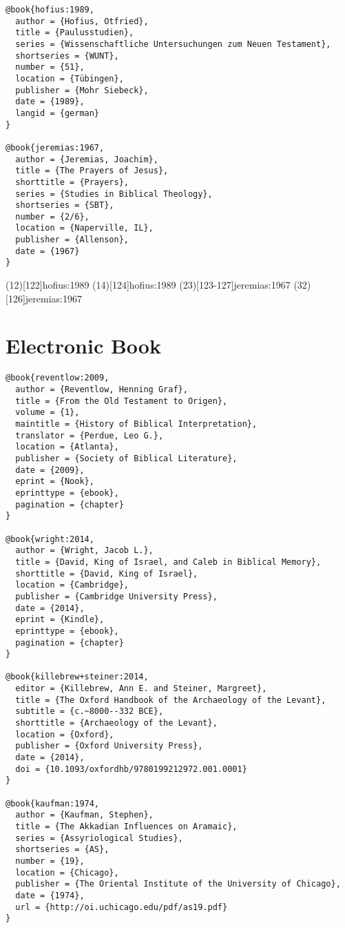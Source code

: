 \documentclass[a4paper]{article}
\begin{document}
\begin{verbatim}
@book{hofius:1989,
  author = {Hofius, Otfried},
  title = {Paulusstudien},
  series = {Wissenschaftliche Untersuchungen zum Neuen Testament},
  shortseries = {WUNT},
  number = {51},
  location = {Tübingen},
  publisher = {Mohr Siebeck},
  date = {1989},
  langid = {german}
}

@book{jeremias:1967,
  author = {Jeremias, Joachim},
  title = {The Prayers of Jesus},
  shorttitle = {Prayers},
  series = {Studies in Biblical Theology},
  shortseries = {SBT},
  number = {2/6},
  location = {Naperville, IL},
  publisher = {Allenson},
  date = {1967}
}
\end{verbatim}

\examplecite(12)[122]{hofius:1989}
\examplecite(14)[124]{hofius:1989}
\examplecite(23)[123-127]{jeremias:1967}
\examplecite(32)[126]{jeremias:1967}
\exampleabbreviations
\examplebibliography

\section{Electronic Book}

\begin{verbatim}
@book{reventlow:2009,
  author = {Reventlow, Henning Graf},
  title = {From the Old Testament to Origen},
  volume = {1},
  maintitle = {History of Biblical Interpretation},
  translator = {Perdue, Leo G.},
  location = {Atlanta},
  publisher = {Society of Biblical Literature},
  date = {2009},
  eprint = {Nook},
  eprinttype = {ebook},
  pagination = {chapter}
}

@book{wright:2014,
  author = {Wright, Jacob L.},
  title = {David, King of Israel, and Caleb in Biblical Memory},
  shorttitle = {David, King of Israel},
  location = {Cambridge},
  publisher = {Cambridge University Press},
  date = {2014},
  eprint = {Kindle},
  eprinttype = {ebook},
  pagination = {chapter}
}

@book{killebrew+steiner:2014,
  editor = {Killebrew, Ann E. and Steiner, Margreet},
  title = {The Oxford Handbook of the Archaeology of the Levant},
  subtitle = {c.~8000--332 BCE},
  shorttitle = {Archaeology of the Levant},
  location = {Oxford},
  publisher = {Oxford University Press},
  date = {2014},
  doi = {10.1093/oxfordhb/9780199212972.001.0001}
}

@book{kaufman:1974,
  author = {Kaufman, Stephen},
  title = {The Akkadian Influences on Aramaic},
  series = {Assyriological Studies},
  shortseries = {AS},
  number = {19},
  location = {Chicago},
  publisher = {The Oriental Institute of the University of Chicago},
  date = {1974},
  url = {http://oi.uchicago.edu/pdf/as19.pdf}
}
\end{verbatim}
\end{document}
